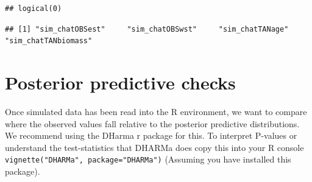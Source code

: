 \documentclass[
]{book}
\newenvironment{Shaded}{\begin{snugshade}}{\end{snugshade}}
\newcommand{\AttributeTok}[1]{\textcolor[rgb]{0.77,0.63,0.00}{#1}}
\newcommand{\CommentTok}[1]{\textcolor[rgb]{0.56,0.35,0.01}{\textit{#1}}}
\newcommand{\ConstantTok}[1]{\textcolor[rgb]{0.00,0.00,0.00}{#1}}
\newcommand{\FunctionTok}[1]{\textcolor[rgb]{0.00,0.00,0.00}{#1}}
\newcommand{\NormalTok}[1]{#1}
\newcommand{\OtherTok}[1]{\textcolor[rgb]{0.56,0.35,0.01}{#1}}
\newcommand{\SpecialCharTok}[1]{\textcolor[rgb]{0.00,0.00,0.00}{#1}}
\newcommand{\StringTok}[1]{\textcolor[rgb]{0.31,0.60,0.02}{#1}}
\begin{document}
\begin{Shaded}
\end{Shaded}

\begin{verbatim}
## logical(0)
\end{verbatim}

\begin{Shaded}
\end{Shaded}

\begin{verbatim}
## [1] "sim_chatOBSest"     "sim_chatOBSwst"     "sim_chatTANage"     "sim_chatTANbiomass"
\end{verbatim}

\hypertarget{posterior-predictive-checks}{%
\section{Posterior predictive checks}\label{posterior-predictive-checks}}

Once simulated data has been read into the R environment, we want to compare where the observed values fall relative to the posterior predictive distributions. We recommend using the DHarma r package for this. To interpret P-values or understand the test-statistics that DHARMa does copy this into your R console \texttt{vignette("DHARMa",\ package="DHARMa")} (Assuming you have installed this package).
\end{document}
